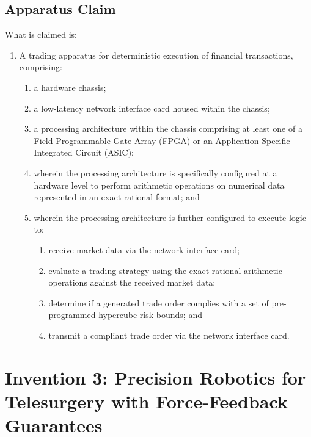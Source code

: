 \documentclass{article}
\begin{document}
\subsection{Apparatus Claim}
\noindent What is claimed is:
\begin{enumerate}
    \item A trading apparatus for deterministic execution of financial transactions, comprising:
    \begin{enumerate}
        \item[(a)] a hardware chassis;
        \item[(b)] a low-latency network interface card housed within the chassis;
        \item[(c)] a processing architecture within the chassis comprising at least one of a Field-Programmable Gate Array (FPGA) or an Application-Specific Integrated Circuit (ASIC);
        \item[(d)] wherein the processing architecture is specifically configured at a hardware level to perform arithmetic operations on numerical data represented in an exact rational format; and
        \item[(e)] wherein the processing architecture is further configured to execute logic to:
        \begin{enumerate}
            \item[(i)] receive market data via the network interface card;
            \item[(ii)] evaluate a trading strategy using the exact rational arithmetic operations against the received market data;
            \item[(iii)] determine if a generated trade order complies with a set of pre-programmed hypercube risk bounds; and
            \item[(iv)] transmit a compliant trade order via the network interface card.
        \end{enumerate}
    \end{enumerate}
\end{enumerate}

\pagebreak

\section{Invention 3: Precision Robotics for Telesurgery with Force-Feedback Guarantees}
\end{document}
